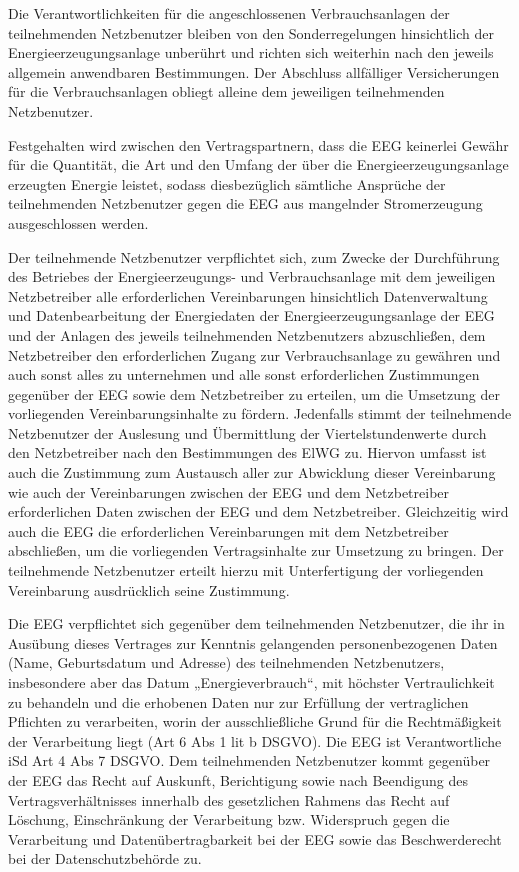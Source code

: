 \documentclass[a4paper,11pt]{article}
\begin{document}
Die Verantwortlichkeiten für die angeschlossenen Verbrauchsanlagen der teilnehmenden Netzbenutzer bleiben von den Sonderregelungen hinsichtlich der Energieerzeugungsanlage unberührt und richten sich weiterhin nach den jeweils allgemein anwendbaren Bestimmungen. Der Abschluss allfälliger Versicherungen für die Verbrauchsanlagen obliegt alleine dem jeweiligen teilnehmenden Netzbenutzer.

Festgehalten wird zwischen den Vertragspartnern, dass die EEG keinerlei Gewähr für die Quantität, die Art und den Umfang der über die Energieerzeugungsanlage erzeugten Energie leistet, sodass diesbezüglich sämtliche Ansprüche der teilnehmenden Netzbenutzer gegen die EEG aus mangelnder Stromerzeugung ausgeschlossen werden.

Der teilnehmende Netzbenutzer verpflichtet sich, zum Zwecke der Durchführung des Betriebes der Energieerzeugungs- und Verbrauchsanlage mit dem jeweiligen Netzbetreiber alle erforderlichen Vereinbarungen hinsichtlich Datenverwaltung und Datenbearbeitung der Energiedaten der Energieerzeugungsanlage der EEG und der Anlagen des jeweils teilnehmenden Netzbenutzers abzuschließen, dem Netzbetreiber den erforderlichen Zugang zur Verbrauchsanlage zu gewähren und auch sonst alles zu unternehmen und alle sonst erforderlichen Zustimmungen gegenüber der EEG sowie dem Netzbetreiber zu erteilen, um die Umsetzung der vorliegenden Vereinbarungsinhalte zu fördern. Jedenfalls stimmt der teilnehmende Netzbenutzer der Auslesung und Übermittlung der Viertelstundenwerte durch den Netzbetreiber nach den Bestimmungen des ElWG zu. Hiervon umfasst ist auch die Zustimmung zum Austausch aller zur Abwicklung dieser Vereinbarung wie auch der Vereinbarungen zwischen der EEG und dem Netzbetreiber erforderlichen Daten zwischen der EEG und dem Netzbetreiber. Gleichzeitig wird auch die EEG die erforderlichen Vereinbarungen mit dem Netzbetreiber abschließen, um die vorliegenden Vertragsinhalte zur Umsetzung zu bringen. Der teilnehmende Netzbenutzer erteilt hierzu mit Unterfertigung der vorliegenden Vereinbarung ausdrücklich seine Zustimmung.

Die EEG verpflichtet sich gegenüber dem teilnehmenden Netzbenutzer, die ihr in Ausübung dieses Vertrages zur Kenntnis gelangenden personenbezogenen Daten (Name, Geburtsdatum und Adresse) des teilnehmenden Netzbenutzers, insbesondere aber das Datum „Energieverbrauch“, mit höchster Vertraulichkeit zu behandeln und die erhobenen Daten nur zur Erfüllung der vertraglichen Pflichten zu verarbeiten, worin der ausschließliche Grund für die Rechtmäßigkeit der Verarbeitung liegt (Art 6 Abs 1 lit b DSGVO). Die EEG ist Verantwortliche iSd Art 4 Abs 7 DSGVO. Dem teilnehmenden Netzbenutzer kommt gegenüber der EEG das Recht auf Auskunft, Berichtigung sowie nach Beendigung des Vertragsverhältnisses innerhalb des gesetzlichen Rahmens das Recht auf Löschung, Einschränkung der Verarbeitung bzw. Widerspruch gegen die Verarbeitung und Datenübertragbarkeit bei der EEG sowie das Beschwerderecht bei der Datenschutzbehörde zu.
\end{document}
